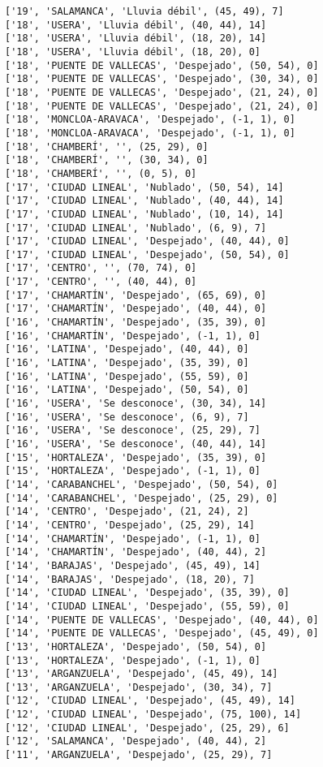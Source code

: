 \documentclass[11pt]{article}
\begin{document}
\begin{Verbatim}[commandchars=\\\{\}]
['19', 'SALAMANCA', 'Lluvia débil', (45, 49), 7]
['18', 'USERA', 'Lluvia débil', (40, 44), 14]
['18', 'USERA', 'Lluvia débil', (18, 20), 14]
['18', 'USERA', 'Lluvia débil', (18, 20), 0]
['18', 'PUENTE DE VALLECAS', 'Despejado', (50, 54), 0]
['18', 'PUENTE DE VALLECAS', 'Despejado', (30, 34), 0]
['18', 'PUENTE DE VALLECAS', 'Despejado', (21, 24), 0]
['18', 'PUENTE DE VALLECAS', 'Despejado', (21, 24), 0]
['18', 'MONCLOA-ARAVACA', 'Despejado', (-1, 1), 0]
['18', 'MONCLOA-ARAVACA', 'Despejado', (-1, 1), 0]
['18', 'CHAMBERÍ', '', (25, 29), 0]
['18', 'CHAMBERÍ', '', (30, 34), 0]
['18', 'CHAMBERÍ', '', (0, 5), 0]
['17', 'CIUDAD LINEAL', 'Nublado', (50, 54), 14]
['17', 'CIUDAD LINEAL', 'Nublado', (40, 44), 14]
['17', 'CIUDAD LINEAL', 'Nublado', (10, 14), 14]
['17', 'CIUDAD LINEAL', 'Nublado', (6, 9), 7]
['17', 'CIUDAD LINEAL', 'Despejado', (40, 44), 0]
['17', 'CIUDAD LINEAL', 'Despejado', (50, 54), 0]
['17', 'CENTRO', '', (70, 74), 0]
['17', 'CENTRO', '', (40, 44), 0]
['17', 'CHAMARTÍN', 'Despejado', (65, 69), 0]
['17', 'CHAMARTÍN', 'Despejado', (40, 44), 0]
['16', 'CHAMARTÍN', 'Despejado', (35, 39), 0]
['16', 'CHAMARTÍN', 'Despejado', (-1, 1), 0]
['16', 'LATINA', 'Despejado', (40, 44), 0]
['16', 'LATINA', 'Despejado', (35, 39), 0]
['16', 'LATINA', 'Despejado', (55, 59), 0]
['16', 'LATINA', 'Despejado', (50, 54), 0]
['16', 'USERA', 'Se desconoce', (30, 34), 14]
['16', 'USERA', 'Se desconoce', (6, 9), 7]
['16', 'USERA', 'Se desconoce', (25, 29), 7]
['16', 'USERA', 'Se desconoce', (40, 44), 14]
['15', 'HORTALEZA', 'Despejado', (35, 39), 0]
['15', 'HORTALEZA', 'Despejado', (-1, 1), 0]
['14', 'CARABANCHEL', 'Despejado', (50, 54), 0]
['14', 'CARABANCHEL', 'Despejado', (25, 29), 0]
['14', 'CENTRO', 'Despejado', (21, 24), 2]
['14', 'CENTRO', 'Despejado', (25, 29), 14]
['14', 'CHAMARTÍN', 'Despejado', (-1, 1), 0]
['14', 'CHAMARTÍN', 'Despejado', (40, 44), 2]
['14', 'BARAJAS', 'Despejado', (45, 49), 14]
['14', 'BARAJAS', 'Despejado', (18, 20), 7]
['14', 'CIUDAD LINEAL', 'Despejado', (35, 39), 0]
['14', 'CIUDAD LINEAL', 'Despejado', (55, 59), 0]
['14', 'PUENTE DE VALLECAS', 'Despejado', (40, 44), 0]
['14', 'PUENTE DE VALLECAS', 'Despejado', (45, 49), 0]
['13', 'HORTALEZA', 'Despejado', (50, 54), 0]
['13', 'HORTALEZA', 'Despejado', (-1, 1), 0]
['13', 'ARGANZUELA', 'Despejado', (45, 49), 14]
['13', 'ARGANZUELA', 'Despejado', (30, 34), 7]
['12', 'CIUDAD LINEAL', 'Despejado', (45, 49), 14]
['12', 'CIUDAD LINEAL', 'Despejado', (75, 100), 14]
['12', 'CIUDAD LINEAL', 'Despejado', (25, 29), 6]
['12', 'SALAMANCA', 'Despejado', (40, 44), 2]
['11', 'ARGANZUELA', 'Despejado', (25, 29), 7]

\end{Verbatim}
\end{document}
